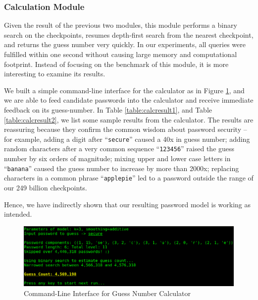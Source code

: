 \documentclass{article} %
\theoremstyle{definition}
\theoremstyle{theorem}
\theoremstyle{remark}
\theoremstyle{remark}
\begin{document}
\subsubsection{Calculation Module}
\par\quad Given the result of the previous two modules, this module performs a binary search on the checkpoints, resumes depth-first search from the nearest checkpoint, and returns the guess number very quickly. In our experiments, all queries were fulfilled within one second without causing large memory and computational footprint. Instead of focusing on the benchmark of this module, it is more interesting to examine its results.

\par\quad We built a simple command-line interface for the calculator as in Figure \ref{fig:calculator}, and we are able to feed candidate passwords into the calculator and receive immediate feedback on its guess-number. In Table \ref{table:calcresult1}, and Table \ref{table:calcresult2}, we list some sample results from the calculator. The results are reassuring because they confirm the common wisdom about password security -- for example, adding a digit after ``\texttt{secure}'' caused a 40x in guess number; adding random characters after a very common sequence ``\texttt{123456}'' raised the guess number by six orders of magnitude; mixing upper and lower case letters in ``\texttt{banana}'' caused the guess number to increase by more than 2000x; replacing characters in a common phrase ``\texttt{applepie}'' led to a password outside the range of our 249 billion checkpoints.

\par\quad Hence, we have indirectly shown that our resulting password model is working as intended. 

        \begin{figure}[!htbp]
        \begin{center}
            \includegraphics[width=.85\textwidth]{diag/calculator.png}
        \end{center}
        \vspace{-10pt}
        \caption{Command-Line Interface for Guess Number Calculator}
        \label{fig:calculator}
        \end{figure}
\end{document}

